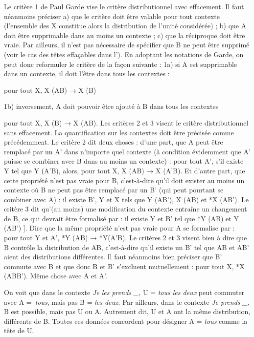 {     Le critère 1 de Paul Garde vise le critère distributionnel avec effacement. Il faut néanmoins préciser a) que le critère doit être valable pour tout contexte (l’ensemble des X constitue alors la distribution de l’unité considérée) ; b) que A doit être supprimable dans au moins un contexte ; c) que la réciproque doit être vraie. Par ailleurs, il n’est pas nécessaire de spécifier que B ne peut être supprimé (voir le cas des têtes effaçables dans l’). En adoptant les notations de Garde, on peut donc reformuler le critère de la façon suivante :
    \ea
    1a) si A est supprimable dans un contexte, il doit l’être dans tous les contextes :

        pour tout X, X (AB) → X (B)

    1b) inversement, A doit pouvoir être ajouté à B dans tous les contextes

        pour tout X, X (B) → X (AB).
    \z
    Les critères 2 et 3 visent le critère distributionnel sans effacement. La quantification sur les contextes doit être précisée comme précédemment. Le critère 2 dit deux choses : d’une part, que A peut être remplacé par un A’ dans n’importe quel contexte (à condition évidemment que A’ puisse se combiner avec B dans au moins un contexte) :
    \ea
    pour tout A’, s’il existe Y tel que Y (A’B), alors, pour tout X, X (AB) → X (A’B).
    \z
    Et d’autre part, que cette propriété n’est pas vraie pour B, c’est-à-dire qu’il doit exister au moins un contexte où B ne peut pas être remplacé par un B’ (qui peut pourtant se combiner avec A) :
    \ea
    il existe B’, Y et X tels que Y (AB’), X (AB) et *X (AB’).
    \z
    Le critère 3 dit qu’(au moins) une modification du contexte entraîne un changement de B, ce qui devrait être formalisé par :
    \ea
    il existe Y et B’ tel que *Y (AB) et Y (AB’) ].
    \z
    Dire que la même propriété n’est pas vraie pour A se formalise par :
    \ea
    pour tout Y et A’, *Y (AB) → *Y(A’B).
    \z
    Le critères 2 et 3 visent bien à dire que B contrôle la distribution de AB, c’est-à-dire qu’il existe un B’ tel que AB et AB’ aient des distributions différentes. Il faut néanmoins bien préciser que B’ commute avec B et que donc B et B’ s’excluent mutuellement :
    \ea
    pour tout X, *X (ABB’).
    \z
    Même chose avec A et A’.

     On voit que dans le contexte \textit{Je les prends \-\_}, U = \textit{tous les deux} peut commuter avec A =~\textit{tous}, mais pas B = \textit{les deux}. Par ailleurs, dans le contexte \textit{Je prends \-\_}, B est possible, mais pas U ou A. Autrement dit, U et A ont la même distribution, différente de B. Toutes ces données concordent pour désigner A = \textit{tous} comme la tête de U.

}
